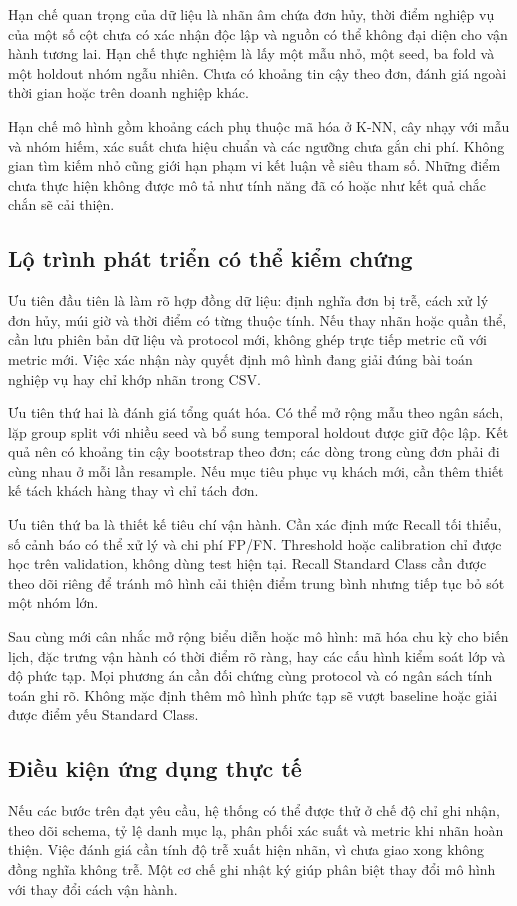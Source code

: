 Hạn chế quan trọng của dữ liệu là nhãn âm chứa đơn hủy, thời điểm nghiệp
vụ của một số cột chưa có xác nhận độc lập và nguồn có thể không đại diện
cho vận hành tương lai. Hạn chế thực nghiệm là lấy một mẫu nhỏ, một seed,
ba fold và một holdout nhóm ngẫu nhiên. Chưa có khoảng tin cậy theo đơn,
đánh giá ngoài thời gian hoặc trên doanh nghiệp khác.

Hạn chế mô hình gồm khoảng cách phụ thuộc mã hóa ở K-NN, cây nhạy với
mẫu và nhóm hiếm, xác suất chưa hiệu chuẩn và các ngưỡng chưa gắn chi
phí. Không gian tìm kiếm nhỏ cũng giới hạn phạm vi kết luận về siêu
tham số. Những điểm chưa thực hiện không được mô tả như tính năng đã
có hoặc như kết quả chắc chắn sẽ cải thiện.

\subsection{Lộ trình phát triển có thể kiểm chứng}
Ưu tiên đầu tiên là làm rõ hợp đồng dữ liệu: định nghĩa đơn bị trễ,
cách xử lý đơn hủy, múi giờ và thời điểm có từng thuộc tính. Nếu thay
nhãn hoặc quần thể, cần lưu phiên bản dữ liệu và protocol mới, không
ghép trực tiếp metric cũ với metric mới. Việc xác nhận này quyết định
mô hình đang giải đúng bài toán nghiệp vụ hay chỉ khớp nhãn trong CSV.

Ưu tiên thứ hai là đánh giá tổng quát hóa. Có thể mở rộng mẫu theo ngân
sách, lặp group split với nhiều seed và bổ sung temporal holdout được
giữ độc lập. Kết quả nên có khoảng tin cậy bootstrap theo đơn; các dòng
trong cùng đơn phải đi cùng nhau ở mỗi lần resample. Nếu mục tiêu phục
vụ khách mới, cần thêm thiết kế tách khách hàng thay vì chỉ tách đơn.

Ưu tiên thứ ba là thiết kế tiêu chí vận hành. Cần xác định mức Recall
tối thiểu, số cảnh báo có thể xử lý và chi phí FP/FN. Threshold hoặc
calibration chỉ được học trên validation, không dùng test hiện tại.
Recall Standard Class cần được theo dõi riêng để tránh mô hình cải
thiện điểm trung bình nhưng tiếp tục bỏ sót một nhóm lớn.

Sau cùng mới cân nhắc mở rộng biểu diễn hoặc mô hình: mã hóa chu kỳ
cho biến lịch, đặc trưng vận hành có thời điểm rõ ràng, hay các cấu hình
kiểm soát lớp và độ phức tạp. Mọi phương án cần đối chứng cùng protocol
và có ngân sách tính toán ghi rõ. Không mặc định thêm mô hình phức tạp
sẽ vượt baseline hoặc giải được điểm yếu Standard Class.

\subsection{Điều kiện ứng dụng thực tế}
Nếu các bước trên đạt yêu cầu, hệ thống có thể được thử ở chế độ chỉ
ghi nhận, theo dõi schema, tỷ lệ danh mục lạ, phân phối xác suất và metric
khi nhãn hoàn thiện. Việc đánh giá cần tính độ trễ xuất hiện nhãn, vì
chưa giao xong không đồng nghĩa không trễ. Một cơ chế ghi nhật ký giúp
phân biệt thay đổi mô hình với thay đổi cách vận hành.

